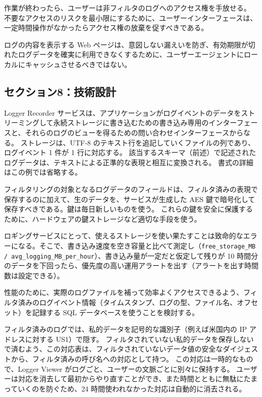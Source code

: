 \documentclass[uplatex]{jsarticle}
\begin{document}
作業が終わったら、ユーザーは非フィルタのログへのアクセス権を手放せる。
不要なアクセスのリスクを最小限にするために、ユーザーインターフェースは、一定時間操作がなかったらアクセス権の放棄を促すべきである。

ログの内容を表示する Web ページは、意図しない漏えいを防ぎ、有効期限が切れたログデータを確実に利用できなくするために、ユーザーエージェントにローカルにキャッシュさせるべきではない。

\subsection{セクション8：技術設計}

Logger Recorder サービスは、アプリケーションがログイベントのデータをストリーミングして永続ストレージに書き込むための書き込み専用のインターフェースと、それらのログのビューを得るための問い合わせインターフェースからなる。
ストレージは、UTF-8 のテキスト行を追記していくファイルの列であり、ログイベント 1 件が 1 行に対応する。
該当するスキーマ（前述）で記述されたログデータは、テキストによる正準的な表現と相互に変換される。
書式の詳細はこの例では省略する。

フィルタリングの対象となるログデータのフィールドは、フィルタ済みの表現で保存するのに加えて、生のデータを、サービスが生成した AES 鍵で暗号化して保存すべきである。鍵は毎日新しいものを使う。
これらの鍵を安全に保護するために、ハードウェアの鍵ストレージなど適切な手段を使う。

ロギングサービスにとって、使えるストレージを使い果たすことは致命的なエラーになる。そこで、書き込み速度を空き容量と比べて測定し（\texttt{free\_storage\_MB / avg\_logging\_MB\_per\_hour}）、書き込み量が一定だと仮定して残りが 10 時間分のデータを下回ったら、優先度の高い運用アラートを出す（アラートを出す時間数は設定できる）。

性能のために、実際のログファイルを補って効率よくアクセスできるよう、フィルタ済みのログイベント情報（タイムスタンプ、ログの型、ファイル名、オフセット）を記録する SQL データベースを使うことを検討する。

フィルタ済みのログでは、私的データを記号的な識別子（例えば米国内の IP アドレスに対する US1）で隠す。
フィルタされていない私的データを保存しないで済むよう、この対応表は、フィルタされていないデータ値の安全なダイジェストから、フィルタ済みの呼び名への対応として持つ。
この対応は一時的なもので、Logger Viewer がログごと、ユーザーの文脈ごとに別々に保持する。
ユーザーは対応を消去して最初からやり直すことができ、また時間とともに無駄にたまっていくのを防ぐため、24 時間使われなかった対応は自動的に消去される。
\end{document}
